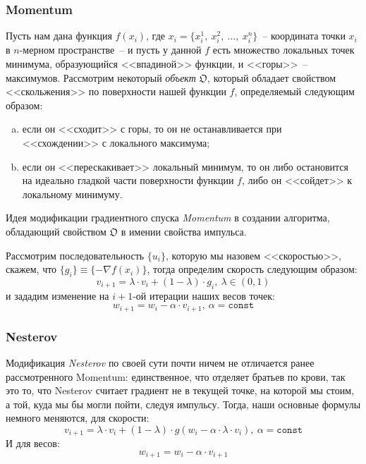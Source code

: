 \documentclass[12pt, a4paper, oneside, final]{article}
\begin{document}
	\subsubsection*{Momentum}
	Пусть нам дана функция $f(x_{i})$, где $x_{i} = \{x_{i}^{1}, ~ x_{i}^{2}, ~ \ldots, ~ x_{i}^{n}\}$~-- координата точки $x_{i}$ в $n$-мерном пространстве~-- и пусть у данной $f$ есть множество локальных точек минимума, образующийся <<впадиной>> функции, и <<горы>>~-- максимумов.
	Рассмотрим некоторый \textit{объект} $\mathfrak{O}$, который обладает свойством <<скольжения>> по поверхности нашей функции $f$, определяемый следующим образом:
	\begin{enumerate}[a)]
		\item если он <<сходит>> с горы, то он не останавливается при <<схождении>> с локального максимума;
		\item если он <<перескакивает>> локальный минимум, то он либо остановится на идеально гладкой части поверхности функции $f$, либо он <<сойдет>> к локальному минимуму.
	\end{enumerate}
	Идея модификации градиентного спуска \textit{Momentum} в создании алгоритма, обладающий свойством $\mathfrak{O}$ в имении свойства импульса.

	Рассмотрим последовательность $\{u_{i}\}$, которую мы назовем <<скоростью>>, скажем, что $\{g_{i}\} \equiv \{-\nabla{f(x_{i})}\}$, тогда определим скорость следующим образом:
	\[
		v_{i + 1} = \lambda \cdot v_{i} + (1 - \lambda) \cdot g_{i}, ~ \lambda \in (0, 1)
	\] и зададим изменение на $i + 1$-ой итерации наших весов точек:
	\[
		w_{i + 1} = w_{i} - \alpha \cdot v_{i + 1}, ~ \alpha = \mathtt{const}
	\]
	\subsubsection*{Nesterov}
	Модификация \textit{Nesterov} по своей сути почти ничем не отличается ранее рассмотренного Momentum: единственное, что отделяет братьев по крови, так это то, что Nesterov считает градиент не в текущей точке, на которой мы стоим, а той, куда мы бы могли пойти, следуя импульсу.
	Тогда, наши основные формулы немного меняются, для скорости:
	\[
		v_{i + 1} = \lambda \cdot v_{i} + (1 - \lambda) \cdot g(w_{i} - \alpha \cdot \lambda \cdot v_{i}), ~ \alpha = \mathtt{const}
	\]
	И для весов:
	\[
		w_{i + 1} = w_{i} - \alpha \cdot v_{i + 1}
	\]
\end{document}
